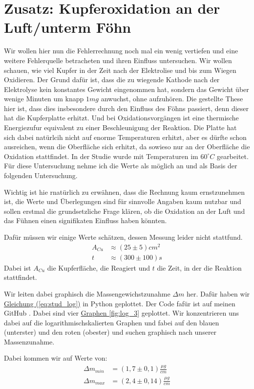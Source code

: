 \section{Zusatz: Kupferoxidation an der Luft/unterm Föhn}
Wir wollen hier nun die Fehlerrechnung noch mal ein wenig vertiefen und eine weitere Fehlerquelle betracheten und ihren Einfluss untersuchen. Wir wollen schauen, wie viel Kupfer in der Zeit nach der Elektrolise und bis zum Wiegen Oxidieren.
Der Grund dafür ist, dass die zu wiegende Kathode nach der Elektrolyse kein konstantes Gewicht eingenommen hat, sondern das Gewicht über wenige Minuten um knapp $1mg$ anwuchst, ohne aufzuhören.
Die gestellte These hier ist, dass dies insbesondere durch den Einfluss des Föhns passiert, denn dieser hat die Kupferplatte erhitzt. Und bei Oxidationsvorgängen ist eine thermische Energiezufur equivalent zu einer Beschleunigung der Reaktion.
Die Platte hat sich dabei natürlcih nicht auf enorme Temperaturen erhitzt, aber es dürfte schon ausreichen, wenn die Oberfläche sich erhitzt, da sowieso nur an der Oberfläche die Oxidation stattfindet. In der Studie \cite{KupferStudie}
wurde mit Temperaturen im $60^\circ C$ gearbeitet. Für diese Untersuchung nehme ich die Werte als möglich an und als Basis der folgenden Untersuchung.

Wichtig ist hie rnatürlich zu erwähnen, dass die Rechnung kaum ernstzunehmen ist, die Werte und Überlegungen sind für sinnvolle Angaben kaum nutzbar und sollen erstmal die grundsetzliche Frage klären, ob die Oxidation an der Luft und das Fühnen einen signifikaten Einfluss haben könnten.

Dafür müssen wir einige Werte schätzen, dessen Messung leider nicht stattfund.
\begin{align}
    A_{Cu} &\approx (25 \pm 5)cm^2 \\
    t &\approx (300\pm100)s
\end{align}
Dabei ist $A_{Cu}$ die Kupferfläche, die Reagiert und $t$ die Zeit, in der die Reaktion stattfindet.

Wir leiten dabei graphisch die Massengewichstzunahme $\Delta m$ her. Dafür haben wir \hyperref[eq:stud_log]{Gleichung (\ref*{eq:stud_log})} in Python geplottet. Der Code fafür ist auf meinen GitHub \cite{githubPAP1}. 
Dabei sind vier \hyperref[fig:log_3]{Graphen \ref*{fig:log_3}} geplottet. Wir konzentrieren uns dabei auf die logarithmischskalierten Graphen und fabei auf den blauen (unterster) und den roten (obester) und suchen graphisch nach unserer Massenzunahme. 

Dabei kommen wir auf Werte von:
\begin{align}
    \Delta m_{min} &= (1,7 \pm 0,1)\frac{\mu g}{cm} \\
    \Delta m_{max} &= (2,4 \pm 0,14)\frac{\mu g}{cm}
\end{align}

